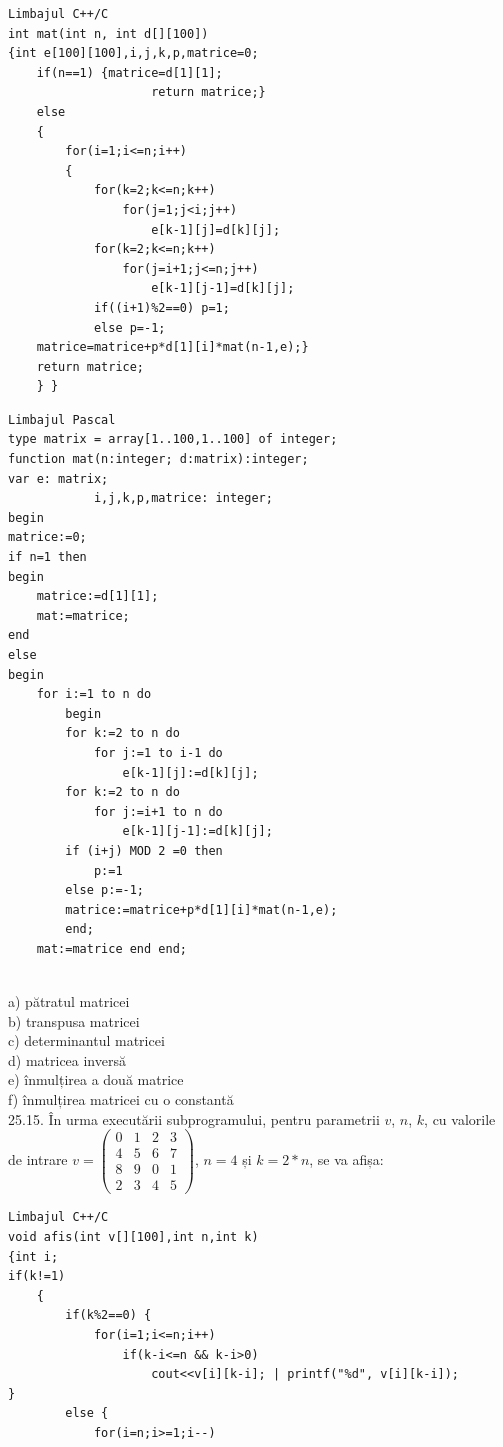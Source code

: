 {{\begin{verbatim}
Limbajul C++/C
int mat(int n, int d[][100])
{int e[100][100],i,j,k,p,matrice=0;
    if(n==1) {matrice=d[1][1];
                    return matrice;}
    else
    {
        for(i=1;i<=n;i++)
        {
            for(k=2;k<=n;k++)
                for(j=1;j<i;j++)
                    e[k-1][j]=d[k][j];
            for(k=2;k<=n;k++)
                for(j=i+1;j<=n;j++)
                    e[k-1][j-1]=d[k][j];
            if((i+1)%2==0) p=1;
            else p=-1;
    matrice=matrice+p*d[1][i]*mat(n-1,e);}
    return matrice;
    } }
\end{verbatim}
\begin{verbatim}
Limbajul Pascal
type matrix = array[1..100,1..100] of integer;
function mat(n:integer; d:matrix):integer;
var e: matrix;
            i,j,k,p,matrice: integer;
begin
matrice:=0;
if n=1 then
begin
    matrice:=d[1][1];
    mat:=matrice;
end
else
begin
    for i:=1 to n do
        begin
        for k:=2 to n do
            for j:=1 to i-1 do
                e[k-1][j]:=d[k][j];
        for k:=2 to n do
            for j:=i+1 to n do
                e[k-1][j-1]:=d[k][j];
        if (i+j) MOD 2 =0 then
            p:=1
        else p:=-1;
        matrice:=matrice+p*d[1][i]*mat(n-1,e);
        end;
    mat:=matrice end end;
\end{verbatim}
\\
a) pătratul matricei
\\
b) transpusa matricei
\\
c) determinantul matricei
\\
d) matricea inversă
\\
e) înmulțirea a două matrice
\\
f) înmulțirea matricei cu o constantă
\\
25.15. În urma executării subprogramului, pentru parametrii $v$, $n$, $k$, cu valorile de intrare $v=\left(\begin{array}{llll}0 & 1 & 2 & 3 \\ 4 & 5 & 6 & 7 \\ 8 & 9 & 0 & 1 \\ 2 & 3 & 4 & 5\end{array}\right)$, $n=4$ și $k=2 * n$, se va afișa:
\begin{verbatim}
Limbajul C++/C
void afis(int v[][100],int n,int k)
{int i;
if(k!=1)
    {
        if(k%2==0) {
            for(i=1;i<=n;i++)
                if(k-i<=n && k-i>0)
                    cout<<v[i][k-i]; | printf("%d", v[i][k-i]);
}
        else {
            for(i=n;i>=1;i--)

\end{verbatim}}}
